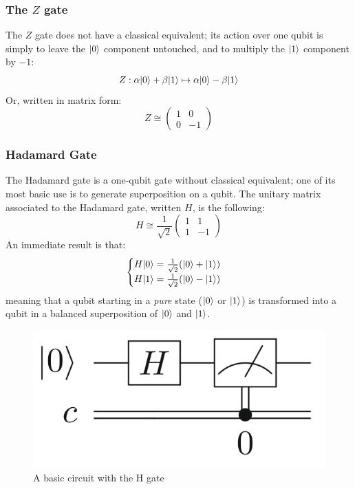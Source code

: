 \documentclass[12pt,a4paper]{article}
\theoremstyle{plain}
\theoremstyle{definition}
\DeclarePairedDelimiter\ket{\lvert}{\rangle}
\begin{document}
\subsubsection{The \texorpdfstring{$Z$}{Z} gate}
The $Z$ gate does not have a classical equivalent; its action over one qubit is simply to leave the $\ket{0}$ component untouched, and to multiply the $\ket{1}$ component by $-1$:
\begin{equation*}
    Z : \alpha\ket{0} + \beta\ket{1} \mapsto \alpha\ket{0} - \beta\ket{1}
\end{equation*}
Or, written in matrix form:
\begin{equation*}
    Z \cong \begin{pmatrix}
        1&0\\
        0&-1
    \end{pmatrix}
\end{equation*}

\subsubsection{Hadamard Gate}
The Hadamard gate is a one-qubit gate without classical equivalent; one of its most basic use is to generate superposition on a qubit. The unitary matrix associated to the Hadamard gate, written $H$, is the following:
\begin{equation*}
    H \cong \frac{1}{\sqrt{2}}
    \begin{pmatrix}
        1&1\\
        1&-1
    \end{pmatrix}
\end{equation*}
An immediate result is that:
\begin{equation*}
    \begin{cases}
        H\ket{0} = \frac{1}{\sqrt{2}}(\ket{0}+\ket{1}) \\
        H\ket{1} = \frac{1}{\sqrt{2}}(\ket{0}-\ket{1})
    \end{cases}
\end{equation*}
meaning that a qubit starting in a \emph{pure} state ($\ket{0}$ or $\ket{1}$) is transformed into a qubit in a balanced superposition of $\ket{0}$ and $\ket{1}$.

\begin{figure}
    \label{fig:basic-circuit}
    \centering
    \includegraphics*[scale=0.3]{basic-circuit.png}
    \caption{A basic circuit with the H gate}
\end{figure}
\end{document}

